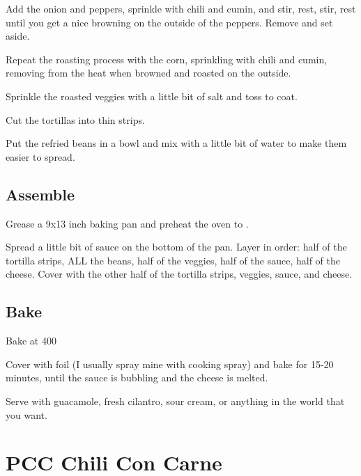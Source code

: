 \documentclass[letterpaper,10pt,english]{sphinxmanual}
\begin{document}
Add the onion and peppers, sprinkle with chili and cumin, and stir, rest, stir, rest until you get a nice browning on the outside of the peppers. Remove and set aside.

Repeat the roasting process with the corn, sprinkling with chili and cumin, removing from the heat when browned and roasted on the outside.

Sprinkle the roasted veggies with a little bit of salt and toss to coat.

Cut the tortillas into thin strips.

Put the refried beans in a bowl and mix with a little bit of water to make them easier to spread.


\section{Assemble}
\label{\detokenize{Mexican_Pepper_Cassarole:assemble}}
Grease a 9x13 inch baking pan and preheat the oven to .

Spread a little bit of sauce on the bottom of the pan. Layer in order: half of the tortilla strips, ALL the beans, half of the veggies, half of the sauce, half of the cheese. Cover with the other half of the tortilla strips, veggies, sauce, and cheese.


\section{Bake}
\label{\detokenize{Mexican_Pepper_Cassarole:bake}}
Bake at 400

Cover with foil (I usually spray mine with cooking spray) and bake for 15-20 minutes, until the sauce is bubbling and the cheese is melted.

Serve with guacamole, fresh cilantro, sour cream, or anything in the world that you want.


\chapter{PCC Chili Con Carne}
\label{\detokenize{PCC_Chili:pcc-chili-con-carne}}\label{\detokenize{PCC_Chili::doc}}
\end{document}
